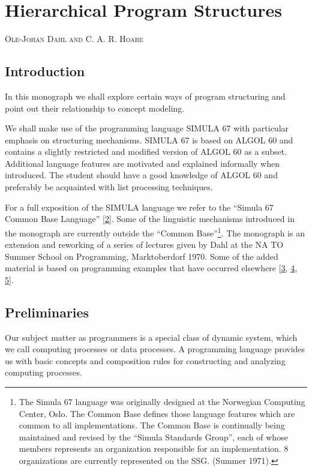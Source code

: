 \chapter{Hierarchical Program Structures}

{
	\noindent
	\scshape\hfill\scriptsize Ole-Johan Dahl and C. A. R. Hoare\hfill
}
\renewcommand{\leftmark}{\normalfont\scriptsize\hfill OLE-JOHAN DAHL AND C. A. R. HOARE\hfill}

\section{Introduction}

In this monograph we shall explore certain ways of program structuring and point out their relationship to concept modeling.

We shall make use of the programming language SIMULA 67 with particular emphasis on structuring mechanisms. SIMULA 67 is based on ALGOL 60 and contains a slightly restricted and modified version of ALGOL 60 as a subset. Additional language features are motivated and explained informally when introduced. The student should have a good knowledge of ALGOL 60 and preferably be acquainted with list processing techniques.

For a full exposition of the SIMULA language we refer to the ``Simula 67 Common Base Language'' [\hyperref[ref:2]{2}]. Some of the linguistic mechanisms introduced in the monograph are currently outside the ``Common Base''\footnote{The Simula 67 language was originally designed at the Norwegian Computing Center, Oslo. The Common Base defines those language features which are common to all implementations. The Common Base is continually being maintained and revised by the ``Simula Standards Group'', each of whose members represents an organization responsible for an implementation. 8 organizations are currently represented on the SSG. (Summer 1971).}. The monograph is an extension and reworking of a series of lectures given by Dahl at the NA TO Summer School on Programming, Marktoberdorf 1970. Some of the added material is based on programming examples that have occurred elsewhere [\hyperref[ref:3]{3}, \hyperref[ref:4]{4}, \hyperref[ref:5]{5}].

\section{Preliminaries}

Our subject matter as programmers is a special class of dynamic system, which we call computing processes or data processes. A programming language provides us with basic concepts and composition rules for constructing and analyzing computing processes.

